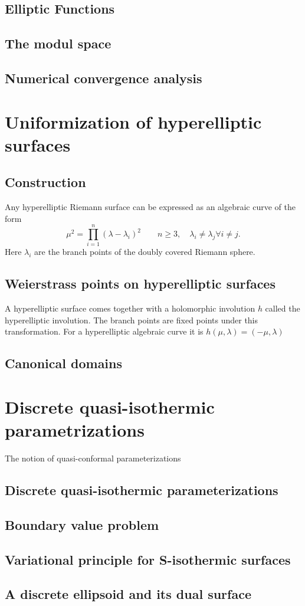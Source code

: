 \documentclass{article}
\begin{document}
\subsection{Elliptic Functions}
\subsection{The modul space}
\subsection{Numerical convergence analysis}

\section{Uniformization of hyperelliptic surfaces}
\subsection{Construction}
Any hyperelliptic Riemann surface can be expressed as an algebraic curve of the form
\[ \mu^2 = \prod_{i=1}^n(\lambda-\lambda_i)^2 \quad\quad n\geq3,\quad \lambda_i\neq \lambda_j \forall i\neq j.\]
Here $\lambda_i$ are the branch points of the doubly covered Riemann sphere.

\subsection{Weierstrass points on hyperelliptic surfaces}
A hyperelliptic surface comes together with a holomorphic involution $h$ called the hyperelliptic involution. The branch points are fixed points under this transformation. For a hyperelliptic algebraic curve it is $h(\mu, \lambda)=(-\mu, \lambda)$

\subsection{Canonical domains}

\section{Discrete quasi-isothermic parametrizations}
The notion of quasi-conformal parameterizations


\subsection{Discrete quasi-isothermic parameterizations}


\subsection{Boundary value problem}
\subsection{Variational principle for S-isothermic surfaces}
\subsection{A discrete ellipsoid and its dual surface}



\end{document}
